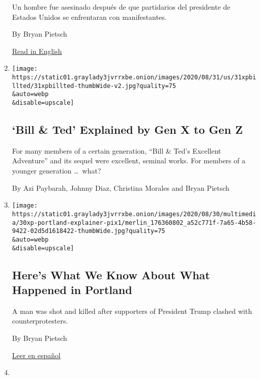 \begin{enumerate}
  Un hombre fue asesinado después de que partidarios del presidente de
  Estados Unidos se enfrentaran con manifestantes.

  By Bryan Pietsch

  \href{https://www.nytimes3xbfgragh.onion/2020/08/30/us/portland-shooting-explained.html}{Read
  in English}
\item
  \href{/2020/08/31/movies/bill-and-teds-excellent-adventure.html}{}

  \texttt{[image: https://static01.graylady3jvrrxbe.onion/images/2020/08/31/us/31xpbillted/31xpbillted-thumbWide-v2.jpg?quality=75\\\&auto=webp\\\&disable=upscale]}

  \hypertarget{bill--ted-explained-by-gen-x-to-gen-z}{%
  \subsection{`Bill \& Ted' Explained by Gen X to Gen
  Z}\label{bill--ted-explained-by-gen-x-to-gen-z}}

  For many members of a certain generation, ``Bill \& Ted's Excellent
  Adventure'' and its sequel were excellent, seminal works. For members
  of a younger generation \ldots{}~what?

  By Azi Paybarah, Johnny Diaz, Christina Morales and Bryan Pietsch
\item
  \href{/2020/08/30/us/portland-shooting-explained.html}{}

  \texttt{[image: https://static01.graylady3jvrrxbe.onion/images/2020/08/30/multimedia/30xp-portland-explainer-pix1/merlin\_176360802\_a52c771f-7a65-4b58-9422-02d5d1618422-thumbWide.jpg?quality=75\\\&auto=webp\\\&disable=upscale]}

  \hypertarget{heres-what-we-know-about-what-happened-in-portland}{%
  \subsection{Here's What We Know About What Happened in
  Portland}\label{heres-what-we-know-about-what-happened-in-portland}}

  A man was shot and killed after supporters of President Trump clashed
  with counterprotesters.

  By Bryan Pietsch

  \href{https://www.nytimes3xbfgragh.onion/es/2020/09/01/espanol/estados-unidos/protestas-portland-tiroteo.html}{Leer
  en español}
\item
  \href{/2020/08/29/us/bison-escape-nebraska.html}{}


\end{enumerate}
